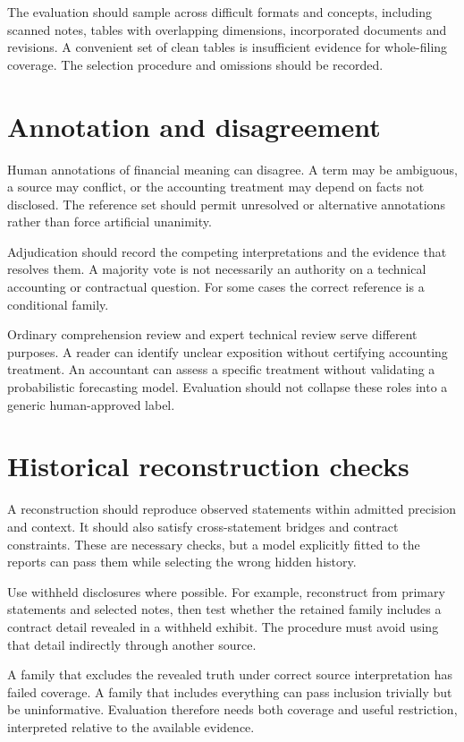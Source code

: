 The evaluation should sample across difficult formats and concepts, including scanned notes, tables with overlapping dimensions, incorporated documents and revisions. A convenient set of clean tables is insufficient evidence for whole-filing coverage. The selection procedure and omissions should be recorded.

\section{Annotation and disagreement}
Human annotations of financial meaning can disagree. A term may be ambiguous, a source may conflict, or the accounting treatment may depend on facts not disclosed. The reference set should permit unresolved or alternative annotations rather than force artificial unanimity.

Adjudication should record the competing interpretations and the evidence that resolves them. A majority vote is not necessarily an authority on a technical accounting or contractual question. For some cases the correct reference is a conditional family.

Ordinary comprehension review and expert technical review serve different purposes. A reader can identify unclear exposition without certifying accounting treatment. An accountant can assess a specific treatment without validating a probabilistic forecasting model. Evaluation should not collapse these roles into a generic human-approved label.

\section{Historical reconstruction checks}
A reconstruction should reproduce observed statements within admitted precision and context. It should also satisfy cross-statement bridges and contract constraints. These are necessary checks, but a model explicitly fitted to the reports can pass them while selecting the wrong hidden history.

Use withheld disclosures where possible. For example, reconstruct from primary statements and selected notes, then test whether the retained family includes a contract detail revealed in a withheld exhibit. The procedure must avoid using that detail indirectly through another source.

A family that excludes the revealed truth under correct source interpretation has failed coverage. A family that includes everything can pass inclusion trivially but be uninformative. Evaluation therefore needs both coverage and useful restriction, interpreted relative to the available evidence.

